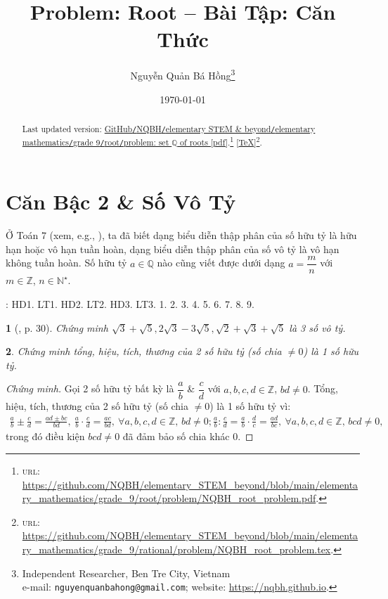 \documentclass{article}
\title{Problem: Root -- Bài Tập: Căn Thức}
\author{Nguyễn Quản Bá Hồng\footnote{Independent Researcher, Ben Tre City, Vietnam\\e-mail: \texttt{nguyenquanbahong@gmail.com}; website: \url{https://nqbh.github.io}.}}
\date{\today}
\newtheorem{baitoan}{}%
\begin{document}
\maketitle
\begin{abstract}
	Last updated version: \href{https://github.com/NQBH/elementary_STEM_beyond/blob/main/elementary_mathematics/grade_9/root/problem/NQBH_root_problem.pdf}{GitHub{\tt/}NQBH{\tt/}elementary STEM \& beyond{\tt/}elementary mathematics{\tt/}grade 9{\tt/}root{\tt/}problem: set $\mathbb{Q}$ of roots [pdf]}.\footnote{\textsc{url}: \url{https://github.com/NQBH/elementary_STEM_beyond/blob/main/elementary_mathematics/grade_9/root/problem/NQBH_root_problem.pdf}.} [\href{https://github.com/NQBH/elementary_STEM_beyond/blob/main/elementary_mathematics/grade_9/root/problem/NQBH_root_problem.tex}{\TeX}]\footnote{\textsc{url}: \url{https://github.com/NQBH/elementary_STEM_beyond/blob/main/elementary_mathematics/grade_9/rational/problem/NQBH_root_problem.tex}.}. 
\end{abstract}
\tableofcontents


\section{Căn Bậc 2 \& Số Vô Tỷ}
Ở Toán 7 (xem, e.g., \cite[\S5, pp. 27--29]{SGK_Toan_7_Canh_Dieu_tap_1}), ta đã biết dạng biểu diễn thập phân của số hữu tỷ là hữu hạn hoặc vô hạn tuần hoàn, dạng biểu diễn thập phân của số vô tỷ là vô hạn không tuần hoàn. Số hữu tỷ $a\in\mathbb{Q}$ nào cũng viết được dưới dạng $a = \dfrac{m}{n}$ với $m\in\mathbb{Z}$, $n\in\mathbb{N}^\star$.

\noindent\cite[Chap. III, \S1, pp. 48--54]{SGK_Toan_9_Canh_Dieu_tap_1}: HD1. LT1. HD2. LT2. HD3. LT3. 1. 2. 3. 4. 5. 6. 7. 8. 9.

\begin{baitoan}[\cite{Binh_boi_duong_Toan_9_tap_1}, p. 30]
	Chứng minh $\sqrt{3} + \sqrt{5},2\sqrt{3} - 3\sqrt{5},\sqrt{2} + \sqrt{3} + \sqrt{5}$ là 3 số vô tỷ.
\end{baitoan}

\begin{baitoan}
	Chứng minh tổng, hiệu, tích, thương của 2 số hữu tỷ (số chia $\ne0$) là 1 số hữu tỷ.
\end{baitoan}

\begin{proof}[Chứng minh]
	Gọi 2 số hữu tỷ bất kỳ là $\dfrac{a}{b}$ \& $\dfrac{c}{d}$ với $a,b,c,d\in\mathbb{Z}$, $bd\ne0$. Tổng, hiệu, tích, thương của 2 số hữu tỷ (số chia $\ne0$) là 1 số hữu tỷ vì:
	\begin{align*}
		\frac{a}{b}\pm\frac{c}{d} = \frac{ad\pm bc}{bd},\ \frac{a}{b}\cdot\frac{c}{d} = \frac{ac}{bd},\ \forall a,b,c,d\in\mathbb{Z},\,bd\ne0; \frac{a}{b}:\frac{c}{d} = \frac{a}{b}\cdot\frac{d}{c} = \frac{ad}{bc},\ \forall a,b,c,d\in\mathbb{Z},\,bcd\ne0,
	\end{align*}
	trong đó điều kiện $bcd\ne0$ đã đảm bảo số chia khác 0.
\end{proof}
\end{document}
